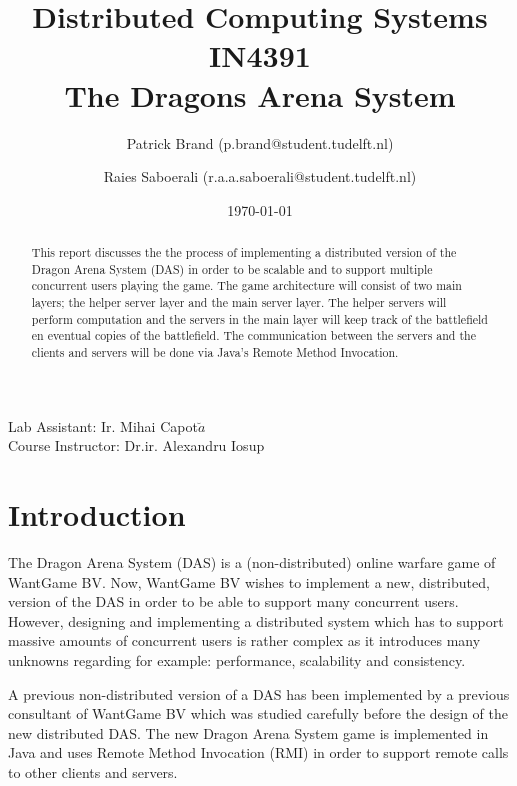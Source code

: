 \documentclass{article}
\title{Distributed Computing Systems IN4391\\ The Dragons Arena System %
}
\author{Patrick Brand (p.brand@student.tudelft.nl) \and
    Raies Saboerali (r.a.a.saboerali@student.tudelft.nl)
}
\date{\today}
\begin{document}
\maketitle
\thispagestyle{empty}
\begin{center}
Lab Assistant: Ir. Mihai Capot$\breve{a}$ \\
Course Instructor: Dr.ir. Alexandru Iosup
\end{center}

\begin{abstract}
This report discusses the the process of implementing a distributed version of the Dragon Arena System (DAS) in order to be scalable and to support multiple concurrent users playing the game.
The game architecture will consist of two main layers; the helper server layer and the main server layer.
The helper servers will perform computation and the servers in the main layer will keep track of the battlefield en eventual copies of the battlefield.
The communication between the servers and the clients and servers will be done via Java's Remote Method Invocation.
\end{abstract}


\section{Introduction}


The Dragon Arena System (DAS) is a (non-distributed) online warfare game of WantGame BV.
Now, WantGame BV wishes to implement a new, distributed, version of the DAS in order to be able to support many concurrent users.
However, designing and implementing a distributed system which has to support massive amounts of concurrent users is rather complex as it introduces many unknowns regarding for example: performance, scalability and consistency.

A previous non-distributed version of a DAS has been implemented by a previous consultant of WantGame BV which was studied carefully before the design of the new distributed DAS.
The new Dragon Arena System game is implemented in Java and uses Remote Method Invocation (RMI) in order to support remote calls to other clients and servers.
\end{document}

